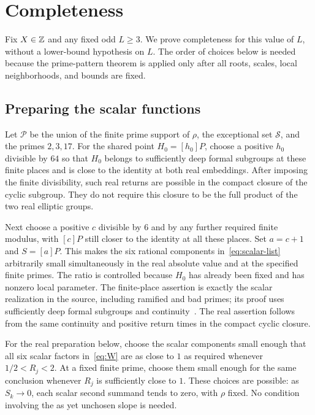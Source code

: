 \documentclass[11pt,a4paper]{article}
\begin{document}
\section{Completeness}

Fix $X\in\mathbb Z$ and any fixed odd $L\ge3$. We prove completeness
for this value of $L$, without a lower-bound hypothesis on $L$.
The order of choices below is needed because the prime-pattern
theorem is applied only after all roots, scales, local neighborhoods,
and bounds are fixed.

\subsection{Preparing the scalar functions}

Let $\mathcal P$ be the union of the finite prime support of $\rho$,
the exceptional set $\mathcal S$, and the primes $2,3,17$.
For the shared point
$H_0=[h_0]P$, choose a positive $h_0$ divisible by $64$ so that
$H_0$ belongs to sufficiently deep formal subgroups at these finite
places and is close to the identity at both real embeddings.
After imposing the finite divisibility, such real returns are possible
in the compact closure of the cyclic subgroup. They do not require
this closure to be the full product of the two real elliptic groups.

Next choose a positive $c$ divisible by $6$ and by any further
required finite modulus, with $[c]P$ still closer to the identity
at all these places. Set $a=c+1$ and $S=[a]P$. This makes the
six rational components in~\eqref{eq:scalar-list} arbitrarily small
simultaneously in the real absolute value and at the specified finite
primes. The ratio is controlled because $H_0$ has already been
fixed and has nonzero local parameter. The finite-place assertion
is exactly the scalar realization in the source, including ramified
and bad primes; its proof uses sufficiently deep formal subgroups
and continuity~\cite{Glazer}. The real assertion follows from
the same continuity and positive return times in the compact cyclic
closure.

For the real preparation below, choose the scalar components small
enough that all six scalar factors in~\eqref{eq:W} are as close
to $1$ as required whenever $1/2<R_j<2$. At a fixed finite prime,
choose them small enough for the same conclusion whenever $R_j$
is sufficiently close to $1$. These choices are possible: as
$S_k\to0$, each scalar second summand tends to zero, with
$\rho$ fixed. No condition involving the as yet unchosen slope
is needed.
\end{document}
